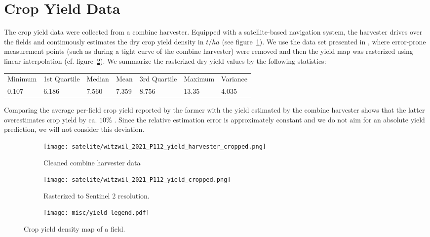 \section{Crop Yield Data}{
	\label{sec:yieldmapping_data}
	The crop yield data were collected from a combine harvester. Equipped with a satellite-based navigation system, the harvester drives over the fields and continuously estimates the dry crop yield density in $t/ha$ (see figure~\ref{fig:satelite/witzwil_2021_P112_yield_harvester_cropped}). 
	We use the data set presented in \cite{perichPixelbasedCropYield2022}, where error-prone measurement points (such as during a tight curve of the combine harvester) were removed and then the yield map was rasterized using linear interpolation (cf. figure~\ref{fig:satelite/witzwil_2021_P112_yield_cropped.png}). We summarize the rasterized dry yield values by the following statistics:

	\begin{tabular}{l l l l l l l} 
		Minimum & 1st Quartile & Median & Mean  & 3rd Quartile & Maximum & Variance \\
		0.107   & 6.186        & 7.560  & 7.359 & 8.756        & 13.35   & 4.035
	\end{tabular}    

	Comparing the average per-field crop yield reported by the farmer with the yield estimated by the combine harvester shows that the latter overestimates crop yield by ca. $10\%$ \citep{perichPixelbasedCropYield2022}. Since the relative estimation error is approximately constant and we do not aim for an absolute yield prediction, we will not consider this deviation. 



	\begin{figure}
		\centering
		\begin{subfigure}{.42\textwidth}
			\centering
			\texttt{[image: satelite/witzwil\_2021\_P112\_yield\_harvester\_cropped.png]}
			\caption{\small Cleaned combine harvester data}
			\label{fig:satelite/witzwil_2021_P112_yield_harvester_cropped}
		\end{subfigure}%
		\begin{subfigure}{.42\textwidth}
			\centering
			\texttt{[image: satelite/witzwil\_2021\_P112\_yield\_cropped.png]}
			\caption{\small Rasterized to Sentinel 2 resolution.}
			\label{fig:satelite/witzwil_2021_P112_yield_cropped.png}
		\end{subfigure}
		\begin{subfigure}{.14\textwidth}
			\centering
			\texttt{[image: misc/yield\_legend.pdf]}
			\vspace{0.5cm}
		\end{subfigure}
		\caption[Crop yield density map of a field]{Crop yield density map of a field. }
		\label{fig:satelite_witzwil_yield}
	\end{figure}
}

